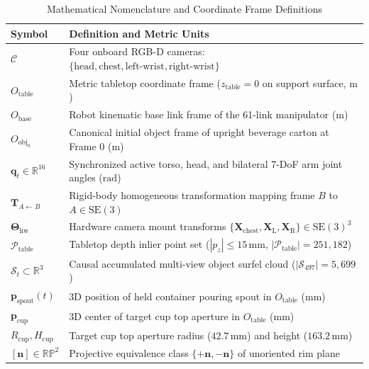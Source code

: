 \documentclass[10pt,journal]{IEEEtran}
\begin{document}
\begin{table}[t]
    \centering
    \caption{Mathematical Nomenclature and Coordinate Frame Definitions}
    \label{tab:nomenclature}
    \scriptsize
    \begin{tabular}{@{}lp{6.3cm}@{}}
        \toprule
        \textbf{Symbol} & \textbf{Definition and Metric Units} \\
        \midrule
        $\mathcal{C}$ & Four onboard RGB-D cameras: $\{\text{head}, \text{chest}, \text{left-wrist}, \text{right-wrist}\}$ \\
        $O_{\mathrm{table}}$ & Metric tabletop coordinate frame ($z_{\mathrm{table}}=0$ on support surface, $\mathrm{m}$) \\
        $O_{\mathrm{base}}$ & Robot kinematic base link frame of the 61-link manipulator ($\mathrm{m}$) \\
        $O_{\mathrm{obj}_0}$ & Canonical initial object frame of upright beverage carton at Frame 0 ($\mathrm{m}$) \\
        $\mathbf{q}_t \in \mathbb{R}^{16}$ & Synchronized active torso, head, and bilateral 7-DoF arm joint angles ($\mathrm{rad}$) \\
        $\mathbf{T}_{A\leftarrow B}$ & Rigid-body homogeneous transformation mapping frame $B$ to $A \in \mathrm{SE}(3)$ \\
        $\boldsymbol{\Theta}_{\mathrm{hw}}$ & Hardware camera mount transforms $\{\mathbf{X}_{\mathrm{chest}}, \mathbf{X}_{\mathrm{L}}, \mathbf{X}_{\mathrm{R}}\} \in \mathrm{SE}(3)^3$ \\
        $\mathcal{P}_{\mathrm{table}}$ & Tabletop depth inlier point set ($|p_z| \le 15\,\mathrm{mm}$, $|\mathcal{P}_{\mathrm{table}}|=251{,}182$) \\
        $\mathcal{S}_t \subset \mathbb{R}^3$ & Causal accumulated multi-view object surfel cloud ($|\mathcal{S}_{497}|=5{,}699$) \\
        $\mathbf{p}_{\mathrm{spout}}(t)$ & 3D position of held container pouring spout in $O_{\mathrm{table}}$ ($\mathrm{mm}$) \\
        $\mathbf{p}_{\mathrm{cup}}$ & 3D center of target cup top aperture in $O_{\mathrm{table}}$ ($\mathrm{mm}$) \\
        $R_{\mathrm{cup}}, H_{\mathrm{cup}}$ & Target cup top aperture radius ($42.7\,\mathrm{mm}$) and height ($163.2\,\mathrm{mm}$) \\
        $[\mathbf{n}] \in \mathbb{RP}^2$ & Projective equivalence class $\{+\mathbf{n}, -\mathbf{n}\}$ of unoriented rim plane \\

\end{tabular}
\end{table}
\end{document}
